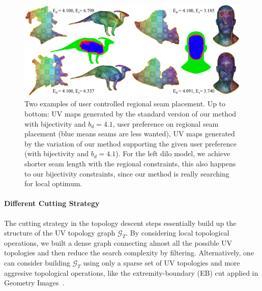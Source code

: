 \begin{figure}[!h]
\centering
\includegraphics[width=\linewidth]{fig/regional_user.png}
\caption{Two examples of user controlled regional seam placement. Up to bottom: UV maps generated by the standard version of our method with bijectivity and $b_d = 4.1$, user preference on regional seam placement (blue means seams are less wanted), UV maps generated by the variation of our method supporting the given user preference (with bijectivity and $b_d = 4.1$). For the left dilo model, we achieve shorter seam length with the regional constraints, this also happens to our bijectivity constraints, since our method is really searching for local optimum.}
\label{fig:regional_seam_placement}
\end{figure}


\paragraph{Different Cutting Strategy}
The cutting strategy in the topology descent steps essentially build up the structure of the UV topology graph $\mathcal{G}_T$. By considering local topological operations, we built a dense graph connecting almost all the possible UV topologies and then reduce the search complexity by filtering. Alternatively, one can consider building $\mathcal{G}_T$ using only a sparse set of UV topologies and more aggresive topological operations, like the extremity-boundary (EB) cut applied in Geometry Images~\cite{Gu2002Geometry}.


